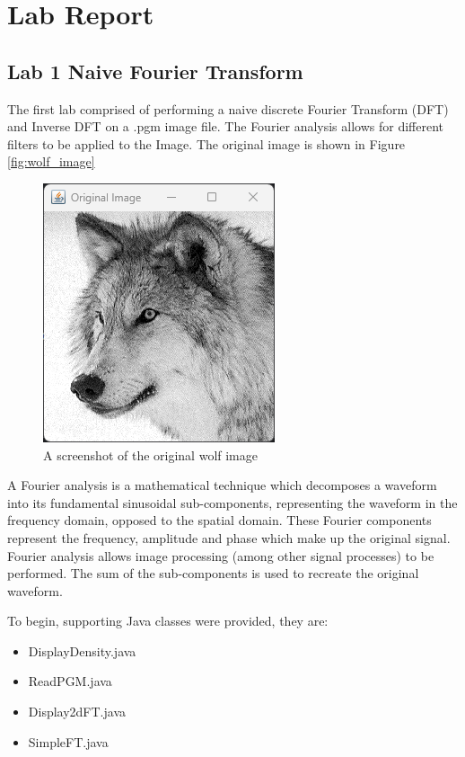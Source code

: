 \chapter{Lab Report}
\section{Lab 1 Naive Fourier Transform}

    The first lab comprised of performing a naive discrete Fourier Transform (DFT) and Inverse DFT on a .pgm image file. The Fourier analysis allows for different filters to be applied to the Image. The original image is shown in Figure \autoref{fig:wolf_image}

    \begin{figure}[H]
        \centering
            \includegraphics[width=0.49\columnwidth]{Figures/Week 1/W1-Wolf-Original.png}
            \caption{A screenshot of the original wolf image}
            \label{fig:wolf_image}
    \end{figure}
    
    A Fourier analysis is a mathematical technique which decomposes a waveform into its fundamental sinusoidal sub-components, representing the waveform in the frequency domain, opposed to the spatial domain. These Fourier components represent the frequency, amplitude and phase which make up the original signal. 
    Fourier analysis allows image processing (among other signal processes) to be performed. The sum of the sub-components is used to recreate the original waveform. 
    

    To begin, supporting Java classes were provided, they are: 
    \begin{itemize}
        \item DisplayDensity.java
        \item ReadPGM.java
        \item Display2dFT.java
        \item SimpleFT.java
    \end{itemize}
        
